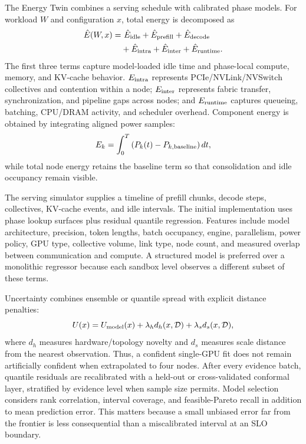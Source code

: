 The Energy Twin combines a serving schedule with calibrated phase models.
For workload $W$ and configuration $x$, total energy is decomposed as
\begin{align}
\hat E(W,x)=&\ \hat E_{\rm idle}+\hat E_{\rm prefill}+\hat E_{\rm decode}
\nonumber\\
&+\hat E_{\rm intra}+\hat E_{\rm inter}+\hat E_{\rm runtime}.
\label{eq:energy-decomp}
\end{align}
The first three terms capture model-loaded idle time and phase-local compute,
memory, and KV-cache behavior.  $E_{\rm intra}$ represents PCIe/NVLink/NVSwitch
collectives and contention within a node; $E_{\rm inter}$ represents fabric
transfer, synchronization, and pipeline gaps across nodes; and
$E_{\rm runtime}$ captures queueing, batching, CPU/DRAM activity, and scheduler
overhead.  Component energy is obtained by integrating aligned power samples:
\begin{equation}
E_k=\int_0^T\left(P_k(t)-P_{k,\rm baseline}\right)dt,
\end{equation}
while total node energy retains the baseline term so that consolidation and
idle occupancy remain visible.

The serving simulator supplies a timeline of prefill chunks, decode steps,
collectives, KV-cache events, and idle intervals.  The initial implementation
uses phase lookup surfaces plus residual quantile regression.  Features include
model architecture, precision, token lengths, batch occupancy, engine,
parallelism, power policy, GPU type, collective volume, link type, node count,
and measured overlap between communication and compute.  A structured model is
preferred over a monolithic regressor because each sandbox level observes a
different subset of these terms.

Uncertainty combines ensemble or quantile spread with explicit distance
penalties:
\begin{equation}
U(x)=U_{\rm model}(x)+\lambda_h d_h(x,\mathcal D)
+\lambda_s d_s(x,\mathcal D),
\label{eq:uncertainty}
\end{equation}
where $d_h$ measures hardware/topology novelty and $d_s$ measures scale
distance from the nearest observation.  Thus, a confident single-GPU fit does
not remain artificially confident when extrapolated to four nodes.
After every evidence batch, quantile residuals are recalibrated with a held-out
or cross-validated conformal layer, stratified by evidence level when sample
size permits.  Model selection considers rank correlation, interval coverage,
and feasible-Pareto recall in addition to mean prediction error.  This matters
because a small unbiased error far from the frontier is less consequential
than a miscalibrated interval at an SLO boundary.

